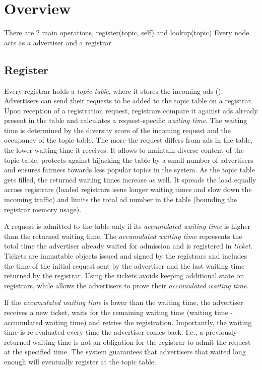 
\section{Overview}

There are 2 main operations, register(topic, self) and lookup(topic)
Every node acts as a advertiser and a registrar

\subsection{Register}
Every registrar holds a \emph{topic table}, where it stores the incoming ads (). Advertisers can send their requests to be added to the topic table on a registrar. Upon reception of a registration request, registrars compare it against ads already present in the table and calculates a request-specific \emph{waiting time}. The waiting time is determined by the diversity score of the incoming request and the occupancy of the topic table.  The more the request differs from ads in the table, the lower waiting time it receives. It allows to maintain diverse content of the topic table, protects against hijacking the table by a small number of advertisers and ensures fairness towards less popular topics in the system. As the topic table gets filled, the returned waiting times increase as well. It spreads the load equally across registrars (loaded registrars issue longer waiting times and slow down the incoming traffic) and limits the total ad number in the table (bounding the registrar memory usage). 

A request is admitted to the table only if its \emph{accumulated waiting time} is higher than the returned waiting time. The \emph{accumulated waiting time} represents the total time the advertiser already waited for admission and is registered in \emph{ticket}. Tickets are immutable objects issued and signed by the registrars and includes the time of the initial request sent by the advertiser and the last waiting time returned by the registrar. Using the tickets avoids keeping additional state on registrars, while allows the advertisers to prove their \emph{accumulated waiting time}. 

If the \emph{accumulated waiting time} is lower than the waiting time, the advertiser receives a new ticket, waits for the remaining waiting time (waiting time - accumulated waiting time) and retries the registration. Importantly, the waiting time is re-evaluated every time the advertiser comes back. I.e., a previously returned waiting time is not an obligation for the registrar to admit the request at the specified time. The system guarantees that advertisers that waited long enough will eventually register at the topic table. 

